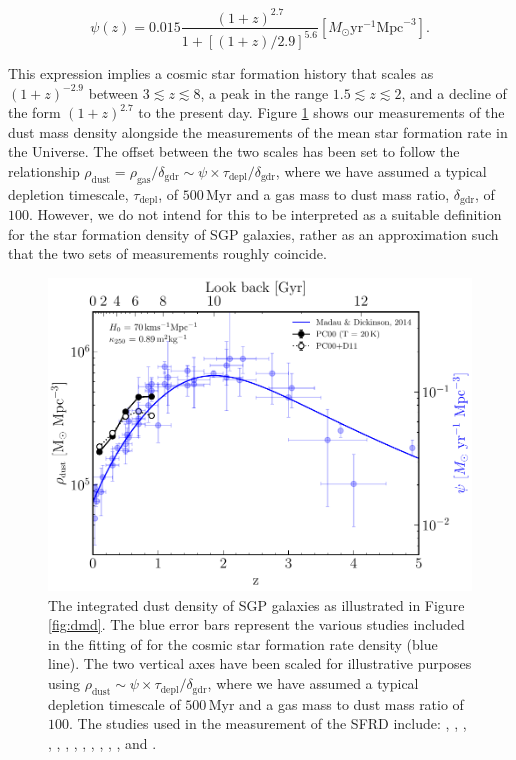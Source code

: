 \begin{equation}
    \psi(z) = 0.015\frac{(1+z)^{2.7}}{1+[(1+z)/2.9]^{5.6}} [M_{\odot}\textrm{yr}^{-1}\textrm{Mpc}^{-3}].
    \label{eq:madau_sfrd}
\end{equation}

This expression implies a cosmic star formation history that scales as $(1+z)^{-2.9}$ between $3 \lesssim z \lesssim 8$, a peak in the range $1.5 \lesssim z \lesssim 2$, and a decline of the form $(1+z)^{2.7}$ to the present day. Figure \ref{fig:sfrd} shows our measurements of the dust mass density alongside the measurements of the mean star formation rate in the Universe. The offset between the two scales has been set to follow the relationship $\rho_{\textrm{dust}} = \rho_{\textrm{gas}}/\delta_{\textrm{gdr}} \sim \psi \times\tau_{\textrm{depl}}/\delta_{\textrm{gdr}}$, where we have assumed a typical depletion timescale, $\tau_{\textrm{depl}}$, of $500\,$Myr and a gas mass to dust mass ratio, $\delta_{\textrm{gdr}}$, of $100$. However, we do not intend for this to be interpreted as a suitable definition for the star formation density of SGP galaxies, rather as an approximation such that the two sets of measurements roughly coincide. 

\begin{figure}
	\centering
	\includegraphics[width=0.75\columnwidth]{Figures/sfrd.pdf}
	\caption[Comparison of dust mass density and the cosmic star formation rate density]{The integrated dust density of SGP galaxies as illustrated in Figure \ref{fig:dmd}. The blue error bars represent the various studies included in the fitting of \citealt{Madau_2014} for the cosmic star formation rate density (blue line). The two vertical axes have been scaled for illustrative purposes using $\rho_{\textrm{dust}} \sim \psi \times\tau_{\textrm{depl}}/\delta_{\textrm{gdr}}$, where we have assumed a typical depletion timescale of $500\,$Myr and a gas mass to dust mass ratio of $100$. The studies used in the measurement of the SFRD include: \citealt{Sanders_2003}, \citealt{Takeuchi_2003}, \citealt{Wyder_2005}, \citealt{Schiminovich_2005}, \citealt{Reddy_2009}, \citealt{Robotham_2011}, \citealt{Magnelli_2011}, \citealt{Cucciati_2012}, \citealt{Bouwens_2012b}, \citealt{Bouwens_2012a}, \citealt{Schenker_2013}, \citealt{Magnelli_2013}, \citealt{Gruppioni_2013} and \citealt{Dahlen_2007}.}
    \label{fig:sfrd}
\end{figure}

